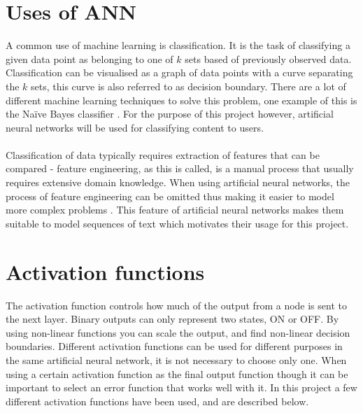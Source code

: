 \section{Uses of ANN}
A common use of machine learning is classification. It is the task of classifying a given data point as belonging to one of $k$ sets based of previously observed data. Classification can be visualised as a graph of data points with a curve separating the $k$ sets, this curve is also referred to as decision boundary. There are a lot of different machine learning techniques to solve this problem, one example of this is the Naïve Bayes classifier \parencite{rish2001empirical}. For the purpose of this project however, artificial neural networks will be used for classifying content to users.
\\\\
Classification of data typically requires extraction of features that can be compared - feature engineering, as this is called, is a manual process that usually requires extensive domain knowledge. When using artificial neural networks, the process of feature engineering can be omitted  thus making it easier to model more complex problems \parencite{nlp2011ronan}. This feature of artificial neural networks makes them suitable to model sequences of text which motivates their usage for this project.


\section{Activation functions}\label{activationfunction}
The activation function controls how much of the output from a node is sent to the next layer. Binary outputs can only represent two states, ON or OFF. By using non-linear functions you can scale the output, and find non-linear decision boundaries. Different activation functions can be used for different purposes in the same artificial neural network, it is not necessary to choose only one. When using a certain activation function as the final output function though it can be important to select an error function that works well with it. In this project a few different activation functions have been used, and are described below.

